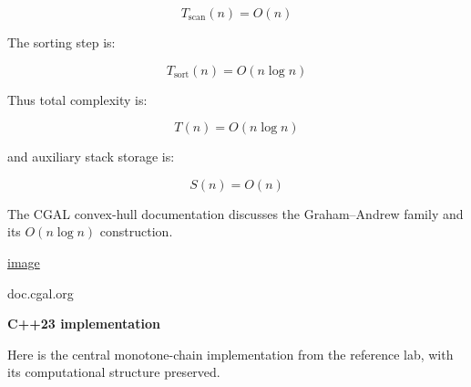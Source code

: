 \[
T_{\mathrm{scan}}(n)=O(n)
\]

The sorting step is:

\[
T_{\mathrm{sort}}(n)=O(n\log n)
\]

Thus total complexity is:

\[
\boxed{T(n)=O(n\log n)}
\]

and auxiliary stack storage is:

\[
\boxed{S(n)=O(n)}
\]

The CGAL convex-hull documentation discusses the Graham--Andrew family and its \(O(n\log n)\) construction. 

\href{https://www.google.com/s2/favicons?domain=https://doc.cgal.org&sz=32}{image}

doc.cgal.org

\textbf{C++23 implementation}

Here is the central monotone-chain implementation from the reference lab, with its computational structure preserved.

